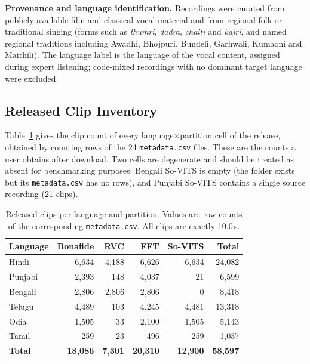\documentclass[conference]{IEEEtran}
\begin{document}
\noindent\textbf{Provenance and language identification.} Recordings were curated from
publicly available film and classical vocal material and from regional folk or
traditional singing (forms such as \textit{thumri}, \textit{dadra}, \textit{chaiti} and
\textit{kajri}, and named regional traditions including Awadhi, Bhojpuri, Bundeli,
Garhwali, Kumaoni and Maithili). The language label is the language of the vocal content,
assigned during expert listening; code-mixed recordings with no dominant target language
were excluded.

\subsection{Released Clip Inventory}
Table~\ref{tab:s2} gives the clip count of every language$\times$partition cell of the
release, obtained by counting rows of the 24 \texttt{metadata.csv} files. These are the
counts a user obtains after download. Two cells are degenerate and should be treated as
absent for benchmarking purposes: Bengali So-VITS is empty (the folder exists but its
\texttt{metadata.csv} has no rows), and Punjabi So-VITS contains a single source
recording (21 clips).

\begin{table}[t]
\centering
\caption{Released clips per language and partition. Values are row counts of the
corresponding \texttt{metadata.csv}. All clips are exactly 10.0\,s.}
\label{tab:s2}
\footnotesize
\setlength{\tabcolsep}{4pt}
\begin{tabular}{lrrrrr}
\toprule
\textbf{Language} & \textbf{Bonafide} & \textbf{RVC} & \textbf{FFT} & \textbf{So-VITS} & \textbf{Total} \\
\midrule
Hindi   & 6{,}634 & 4{,}188 & 6{,}626 & 6{,}634 & 24{,}082 \\
Punjabi & 2{,}393 &   148 & 4{,}037 &    21 &  6{,}599 \\
Bengali & 2{,}806 & 2{,}806 & 2{,}806 &     0 &  8{,}418 \\
Telugu  & 4{,}489 &   103 & 4{,}245 & 4{,}481 & 13{,}318 \\
Odia    & 1{,}505 &    33 & 2{,}100 & 1{,}505 &  5{,}143 \\
Tamil   &   259 &    23 &   496 &   259 &  1{,}037 \\
\midrule
\textbf{Total} & \textbf{18{,}086} & \textbf{7{,}301} & \textbf{20{,}310} & \textbf{12{,}900} & \textbf{58{,}597} \\
\bottomrule
\end{tabular}
\end{table}
\end{document}
